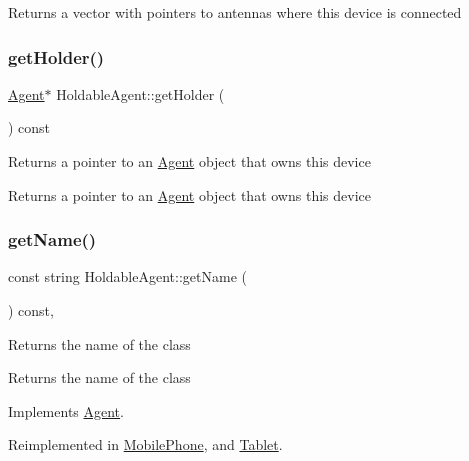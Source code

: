 \begin{DoxyReturn}{Returns}
a vector with pointers to antennas where this device is connected 
\end{DoxyReturn}
\mbox{\label{class_holdable_agent_a51f29e5aecf9d288935ddae6da4096ed}} 
\subsubsection{\texorpdfstring{get\+Holder()}{getHolder()}}
{\footnotesize\ttfamily \hyperlink{class_agent}{Agent}$\ast$ Holdable\+Agent\+::get\+Holder (\begin{DoxyParamCaption}{ }\end{DoxyParamCaption}) const}

Returns a pointer to an \hyperlink{class_agent}{Agent} object that owns this device \begin{DoxyReturn}{Returns}
a pointer to an \hyperlink{class_agent}{Agent} object that owns this device 
\end{DoxyReturn}
\mbox{\label{class_holdable_agent_ab330bb40de51a957ef8826af629f94a2}} 
\subsubsection{\texorpdfstring{get\+Name()}{getName()}}
{\footnotesize\ttfamily const string Holdable\+Agent\+::get\+Name (\begin{DoxyParamCaption}{ }\end{DoxyParamCaption}) const\hspace{0.3cm}{\ttfamily [override]}, {\ttfamily [virtual]}}

Returns the name of the class \begin{DoxyReturn}{Returns}
the name of the class 
\end{DoxyReturn}


Implements \hyperlink{class_agent_afe6c72d91baf9ee4fe77ea1ed7fef3ba}{Agent}.



Reimplemented in \hyperlink{class_mobile_phone_a1eeac3141baafa75ebcf26fc3a0e4068}{Mobile\+Phone}, and \hyperlink{class_tablet_adc7196aaee1e9714236b7cd8825d5826}{Tablet}.

